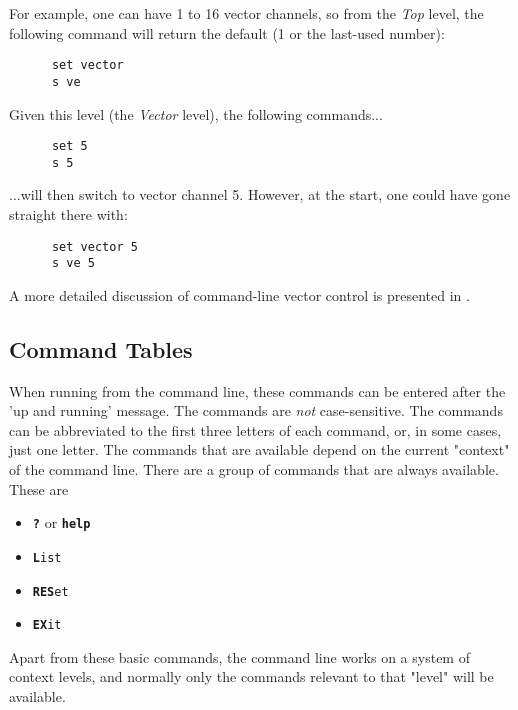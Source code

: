    For example, one can have 1 to 16 vector channels, so from the
   \textsl{Top} level, the following command
   will return the default  (1 or the last-used number):

   \begin{verbatim}
      set vector
      s ve
   \end{verbatim}

   Given this level (the \textsl{Vector} level), the following commands...

   \begin{verbatim}
      set 5
      s 5
   \end{verbatim}

   ...will then switch to vector channel 5.
   However, at the start, one could have gone straight there with:

   \begin{verbatim}
      set vector 5
      s ve 5
   \end{verbatim}

   A more detailed discussion of command-line vector control is presented in
   .

\subsection{Command Tables}
\label{subsec:command_line_command_table}

   When running from the command line, these commands
   can be entered after the 'up and running' message.
   The commands are \textsl{not} case-sensitive.
   The commands can be abbreviated to the first three letters of each command,
   or, in some cases, just one letter.
   The commands that are available depend on the current "context" of the
   command line.
   There are a group of commands that are always available. These are

   \begin{itemize}
      \item \texttt{\textbf{?}} or \texttt{\textbf{help}}
      \item \texttt{\textbf{L}ist}
      \item \texttt{\textbf{RES}et}
      \item \texttt{\textbf{EX}it}
   \end{itemize}

   Apart from these basic commands, the command line works on a system of
   context levels, and normally only the commands relevant to that "level"
   will be available.

